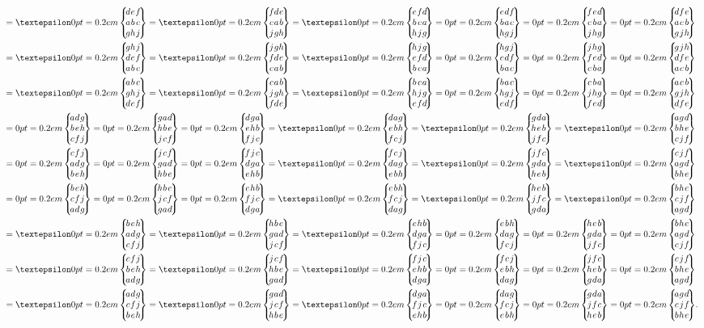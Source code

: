 \begin{align}
& =\varepsilon\ninej{d}{e}{f}{a}{b}{c}{g}{h}{j}=\varepsilon\ninej{f}{d}{e}{c}{a}{b}{j}{g}{h}=\varepsilon\ninej{e}{f}{d}{b}{c}{a}{h}{j}{g}=\ninej{e}{d}{f}{b}{a}{c}{h}{g}{j}=\ninej{f}{e}{d}{c}{b}{a}{j}{h}{g}=\ninej{d}{f}{e}{a}{c}{b}{g}{j}{h}  \notag\\
& =\varepsilon\ninej{g}{h}{j}{d}{e}{f}{a}{b}{c}=\varepsilon\ninej{j}{g}{h}{f}{d}{e}{c}{a}{b}=\varepsilon\ninej{h}{j}{g}{e}{f}{d}{b}{c}{a}=\ninej{h}{g}{j}{e}{d}{f}{b}{a}{c}=\ninej{j}{h}{g}{f}{e}{d}{c}{b}{a}=\ninej{g}{j}{h}{d}{f}{e}{a}{c}{b}  \notag\\
& =\varepsilon\ninej{a}{b}{c}{g}{h}{j}{d}{e}{f}=\varepsilon\ninej{c}{a}{b}{j}{g}{h}{f}{d}{e}=\varepsilon\ninej{b}{c}{a}{h}{j}{g}{e}{f}{d}=\ninej{b}{a}{c}{h}{g}{j}{e}{d}{f}=\ninej{c}{b}{a}{j}{h}{g}{f}{e}{d}=\ninej{a}{c}{b}{g}{j}{h}{d}{f}{e}  \notag\\
& =\ninej{a}{d}{g}{b}{e}{h}{c}{f}{j}=\ninej{g}{a}{d}{h}{b}{e}{j}{c}{f}=\ninej{d}{g}{a}{e}{h}{b}{f}{j}{c}=\varepsilon\ninej{d}{a}{g}{e}{b}{h}{f}{c}{j}=\varepsilon\ninej{g}{d}{a}{h}{e}{b}{j}{f}{c}=\varepsilon\ninej{a}{g}{d}{b}{h}{e}{c}{j}{f}  \notag\\
& =\ninej{c}{f}{j}{a}{d}{g}{b}{e}{h}=\ninej{j}{c}{f}{g}{a}{d}{h}{b}{e}=\ninej{f}{j}{c}{d}{g}{a}{e}{h}{b}=\varepsilon\ninej{f}{c}{j}{d}{a}{g}{e}{b}{h}=\varepsilon\ninej{j}{f}{c}{g}{d}{a}{h}{e}{b}=\varepsilon\ninej{c}{j}{f}{a}{g}{d}{b}{h}{e}  \notag\\
& =\ninej{b}{e}{h}{c}{f}{j}{a}{d}{g}=\ninej{h}{b}{e}{j}{c}{f}{g}{a}{d}=\ninej{e}{h}{b}{f}{j}{c}{d}{g}{a}=\varepsilon\ninej{e}{b}{h}{f}{c}{j}{d}{a}{g}=\varepsilon\ninej{h}{e}{b}{j}{f}{c}{g}{d}{a}=\varepsilon\ninej{b}{h}{e}{c}{j}{f}{a}{g}{d}  \notag\\
& =\varepsilon\ninej{b}{e}{h}{a}{d}{g}{c}{f}{j}=\varepsilon\ninej{h}{b}{e}{g}{a}{d}{j}{c}{f}=\varepsilon\ninej{e}{h}{b}{d}{g}{a}{f}{j}{c}=\ninej{e}{b}{h}{d}{a}{g}{f}{c}{j}=\ninej{h}{e}{b}{g}{d}{a}{j}{f}{c}=\ninej{b}{h}{e}{a}{g}{d}{c}{j}{f}  \notag\\
& =\varepsilon\ninej{c}{f}{j}{b}{e}{h}{a}{d}{g}=\varepsilon\ninej{j}{c}{f}{h}{b}{e}{g}{a}{d}=\varepsilon\ninej{f}{j}{c}{e}{h}{b}{d}{g}{a}=\ninej{f}{c}{j}{e}{b}{h}{d}{a}{g}=\ninej{j}{f}{c}{h}{e}{b}{g}{d}{a}=\ninej{c}{j}{f}{b}{h}{e}{a}{g}{d} \notag\\
& =\varepsilon\ninej{a}{d}{g}{c}{f}{j}{b}{e}{h}=\varepsilon\ninej{g}{a}{d}{j}{c}{f}{h}{b}{e}=\varepsilon\ninej{d}{g}{a}{f}{j}{c}{e}{h}{b}=\ninej{d}{a}{g}{f}{c}{j}{e}{b}{h}=\ninej{g}{d}{a}{j}{f}{c}{h}{e}{b}=\ninej{a}{g}{d}{c}{j}{f}{b}{h}{e}.  \label{eq:10:4:6}
\end{align}
